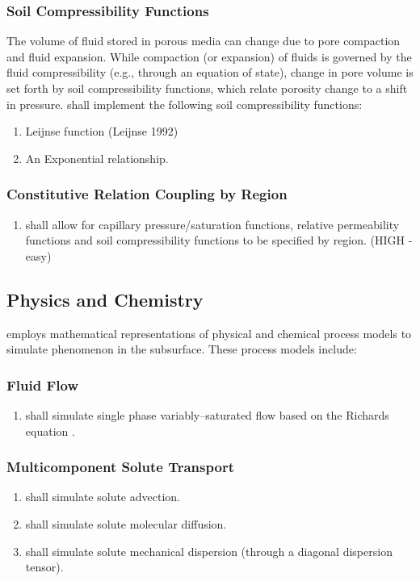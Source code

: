 \subsubsection{Soil Compressibility Functions}
The volume of fluid stored in porous media can change due to pore compaction and fluid expansion. While compaction (or expansion) of fluids is governed by the fluid compressibility (e.g., through an equation of state), change in pore volume is set forth by soil compressibility functions, which relate porosity change to a shift in pressure. \pft shall implement the following soil compressibility functions:
\begin{enumerate}[resume]
	\item \label{leijnse} Leijnse function (Leijnse 1992)
	\item \label{exponential} An Exponential relationship.
\end{enumerate}

\subsubsection{Constitutive Relation Coupling by Region}
\begin{enumerate}[resume]
	\item \pft shall allow for capillary pressure/saturation functions, relative permeability functions and soil compressibility functions to be specified by region. \label{CRbyRegion} (HIGH - easy)
\end{enumerate}

\subsection{Physics and Chemistry}
\pft employs mathematical representations of physical and chemical process models to simulate phenomenon in the subsurface.  These process models include:
\subsubsection{Fluid Flow}
\begin{enumerate}
	\item \label{PCSngVarSatFlow} \pft shall simulate single phase variably--saturated flow based on the Richards equation \cite{richards1931}. 
\end{enumerate}

\subsubsection{Multicomponent Solute Transport}
\begin{enumerate}[resume]
	\item \label{PCAdvection} \pft shall simulate solute advection. 
	\item \label{PCDiffusion} \pft shall simulate solute molecular diffusion.
	\item \label{PCMechanicalDispersion} \pft shall simulate solute mechanical dispersion (through a diagonal dispersion tensor).
\end{enumerate}
